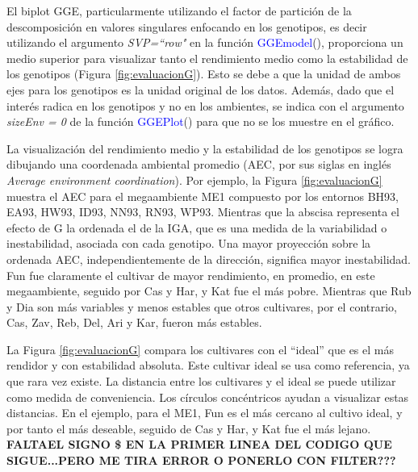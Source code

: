 El biplot GGE, particularmente utilizando el factor de partición de la descomposición en valores singulares enfocando en los genotipos, es decir utilizando el argumento \emph{SVP=``row"} en la función \textcolor{blue}{GGEmodel}(), proporciona un medio superior para visualizar tanto el rendimiento medio como la estabilidad de los genotipos (Figura \ref{fig:evaluacionG}). Esto se debe a que la unidad de ambos ejes para los genotipos es la unidad original de los datos. Además, dado que el interés radica en los genotipos y no en los ambientes, se indica con el argumento \emph{sizeEnv = 0} de la función \textcolor{blue}{GGEPlot}() para que no se los muestre en el gráfico.


La visualización del rendimiento medio y la estabilidad de los genotipos se logra dibujando una coordenada ambiental promedio (AEC, por sus siglas en inglés \emph{Average environment coordination}). Por ejemplo, la Figura \ref{fig:evaluacionG}  muestra el AEC para el megaambiente ME1 compuesto por los entornos BH93, EA93, HW93, ID93, NN93, RN93, WP93. Mientras que la abscisa representa el efecto de G la ordenada el de la IGA, que es una medida de la variabilidad o inestabilidad, asociada con cada genotipo. Una mayor proyección sobre la ordenada AEC, independientemente de la dirección, significa mayor inestabilidad. Fun fue claramente el cultivar de mayor rendimiento, en promedio, en este megaambiente, seguido por Cas y Har, y Kat fue el más pobre. Mientras que Rub y Dia son más variables y menos estables que otros cultivares, por el contrario, Cas, Zav, Reb, Del, Ari y Kar, fueron más estables. 

La Figura \ref{fig:evaluacionG} compara los cultivares con el ``ideal” que es el más rendidor y con estabilidad absoluta. Este cultivar ideal se usa como referencia, ya que rara vez existe. La distancia entre los cultivares y el ideal se puede utilizar como medida de conveniencia. Los círculos concéntricos ayudan a visualizar estas distancias. En el ejemplo, para el ME1, Fun es el más cercano al cultivo ideal, y por tanto el más deseable, seguido de Cas y Har, y Kat fue el más lejano. \\

\textbf{FALTAEL SIGNO \$ EN LA PRIMER LINEA DEL CODIGO QUE SIGUE...PERO ME TIRA ERROR O PONERLO CON FILTER???}

